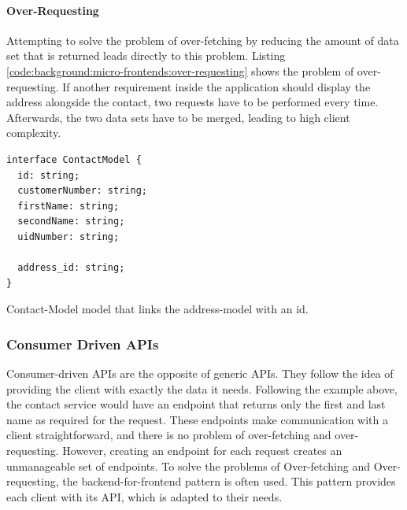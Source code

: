 \paragraph{Over-Requesting}\label{paragraph:background:micro-frontend:generic-vs-consumer-driven-apis:generic-apis:over-requesting}

Attempting to solve the problem of over-fetching by reducing the amount of data set that is returned leads directly to this problem. Listing \ref{code:background:micro-frontends:over-requesting} shows the problem of over-requesting. If another requirement inside the application should display the address alongside the contact, two requests have to be performed every time. Afterwards, the two data sets have to be merged, leading to high client complexity. \cite{misc:2019:leitner:background:micro-frontends:backend-for-frontends}

\ifshowListings
\begin{listing}[H]
    \begin{verbatim}
interface ContactModel {
  id: string;
  customerNumber: string;
  firstName: string;
  secondName: string;
  uidNumber: string;

  address_id: string;
}
    \end{verbatim}
    \caption{Contact-Model model that links the address-model with an id.}\label{code:background:micro-frontends:over-requesting}
\end{listing}
\fi

\subsubsection{Consumer Driven APIs}\label{subsubection:background:micro-frontend:generic-vs-consumer-driven-apis:consumer-driven-apis}

Consumer-driven APIs are the opposite of generic APIs. They follow the idea of providing the client with exactly the data it needs. Following the example above, the contact service would have an endpoint that returns only the first and last name as required for the request. These endpoints make communication with a client straightforward, and there is no problem of over-fetching and over-requesting. However, creating an endpoint for each request creates an unmanageable set of endpoints.  \cite{misc:2019:leitner:background:micro-frontends:backend-for-frontends} To solve the problems of Over-fetching and Over-requesting, the backend-for-frontend pattern is often used. This pattern provides each client with its API, which is adapted to their needs. \cite{book:2018:richardson:background:bff:microservices-patterns}

